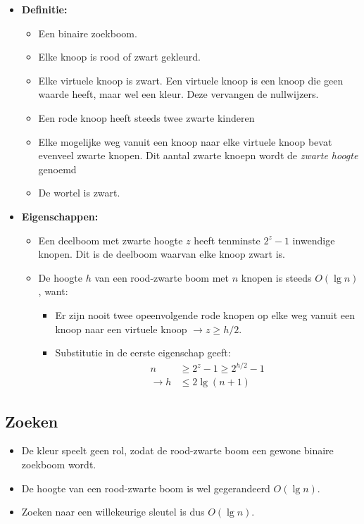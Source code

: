 \label{sec:rood-zwarte bomen}
\begin{itemize}
    \item \textbf{Definitie:}
    \begin{itemize}
        \item Een binaire zoekboom.
        \item Elke knoop is rood of zwart gekleurd.
        \item Elke virtuele knoop is zwart. Een virtuele knoop is een knoop die geen waarde heeft, maar wel een kleur. Deze vervangen de nullwijzers.
        \item Een rode knoop heeft steeds twee zwarte kinderen
        \item Elke mogelijke weg vanuit een knoop naar elke virtuele knoop bevat evenveel zwarte knopen. Dit aantal zwarte knoepn wordt de \textit{zwarte hoogte} genoemd
        \item De wortel is zwart.
    \end{itemize}
    \item \textbf{Eigenschappen:}
    \begin{itemize}
        \item Een deelboom met zwarte hoogte $z$ heeft tenminste $2^z - 1$ inwendige knopen. Dit is de deelboom waarvan elke knoop zwart is.
        \item De hoogte $h$ van een rood-zwarte boom met $n$ knopen is steeds $O(\lg n)$, want:
        \begin{itemize}
            \item Er zijn nooit twee opeenvolgende rode knopen op elke weg vanuit een knoop naar een virtuele knoop $\rightarrow z \geq h/2$.
            \item Substitutie in de eerste eigenschap geeft:
            \begin{align*}
                n &\geq 2^z - 1 \geq 2^{h/2} - 1 \\
                \rightarrow h & \leq 2\lg(n + 1)
            \end{align*}
        \end{itemize}
    \end{itemize}

\end{itemize}
\subsection{Zoeken}
\begin{itemize}
    \item De kleur speelt geen rol, zodat de rood-zwarte boom een gewone binaire zoekboom wordt.
    \item De hoogte van een rood-zwarte boom is wel gegerandeerd $O(\lg n)$.
    \item Zoeken naar een willekeurige sleutel is dus $O(\lg n)$.
\end{itemize}

